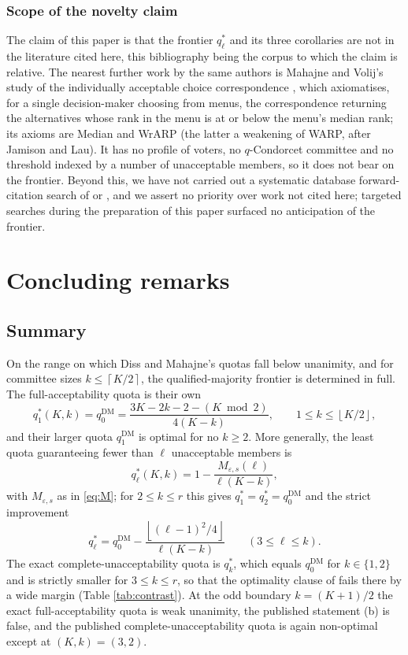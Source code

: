 \documentclass[11pt]{article}
\theoremstyle{plain}
\theoremstyle{definition}
\newcommand{\cl}[1]{\left\lceil #1\right\rceil}
\newcommand{\fl}[1]{\left\lfloor #1\right\rfloor}
\newcommand{\eps}{\varepsilon}
\newcommand{\DM}{\mathrm{DM}}
\begin{document}
\subsubsection*{Scope of the novelty claim}
\label{sec:limits}
The claim of this paper is that the frontier $q_\ell^*$ and its three corollaries are not in the literature cited here, this bibliography being the corpus to which the claim is relative. The nearest further work by the same authors is Mahajne and Volij's study of the individually acceptable choice correspondence \cite{MahajneVolij2020}, which axiomatises, for a single decision-maker choosing from menus, the correspondence returning the alternatives whose rank in the menu is at or below the menu's median rank; its axioms are Median and WrARP (the latter a weakening of WARP, after Jamison and Lau). It has no profile of voters, no $q$-Condorcet committee and no threshold indexed by a number of unacceptable members, so it does not bear on the frontier. Beyond this, we have not carried out a systematic database forward-citation search of \cite{DissMahajne2020} or \cite{MahajneVolij2019}, and we assert no priority over work not cited here; targeted searches during the preparation of this paper surfaced no anticipation of the frontier.

\section{Concluding remarks}
\label{sec:conclusion}

\subsection{Summary}

On the range on which Diss and Mahajne's quotas fall below unanimity, and for committee sizes $k\le\cl{K/2}$, the qualified-majority frontier is determined in full. The full-acceptability quota is their own
\[
q_1^*(K,k)=q_0^{\DM}=\frac{3K-2k-2-(K\bmod2)}{4(K-k)},\qquad 1\le k\le \fl{K/2},
\]
and their larger quota $q_1^{\DM}$ is optimal for no $k\ge2$. More generally, the least quota guaranteeing fewer than $\ell$ unacceptable members is
\[
q_\ell^*(K,k)=1-\frac{M_{\eps,s}(\ell)}{\ell(K-k)},
\]
with $M_{\eps,s}$ as in \eqref{eq:M}; for $2\le k\le r$ this gives $q_1^*=q_2^*=q_0^{\DM}$ and the strict improvement
\[
q_\ell^*=q_0^{\DM}-\frac{\fl{(\ell-1)^2/4}}{\ell(K-k)}\qquad(3\le\ell\le k).
\]
The exact complete-unacceptability quota is $q_k^*$, which equals $q_0^{\DM}$ for $k\in\{1,2\}$ and is strictly smaller for $3\le k\le r$, so that the optimality clause of \cite[Proposition~2(c)]{DissMahajne2020} fails there by a wide margin (Table \ref{tab:contrast}). At the odd boundary $k=(K+1)/2$ the exact full-acceptability quota is weak unanimity, the published statement (b) is false, and the published complete-unacceptability quota is again non-optimal except at $(K,k)=(3,2)$.
\end{document}
